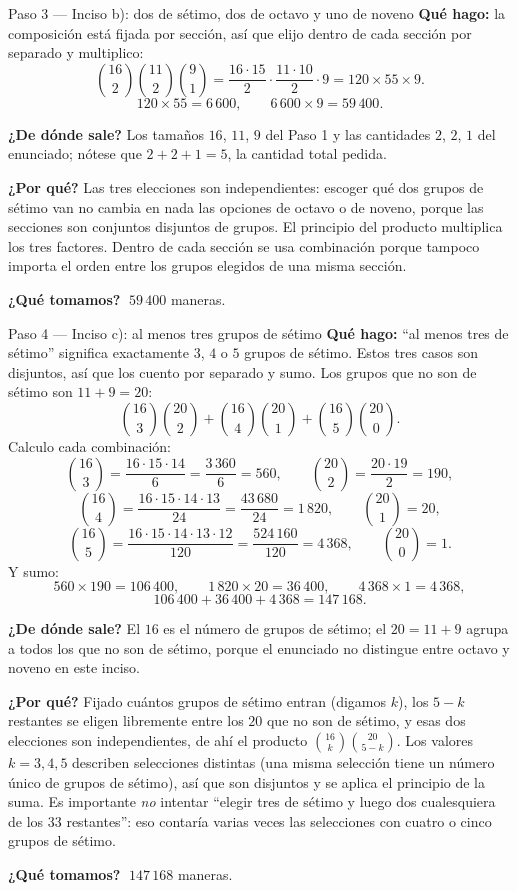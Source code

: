 \documentclass[11pt]{article}
\begin{document}
\begin{paso}{Paso 3 --- Inciso b): dos de sétimo, dos de octavo y uno de noveno}
\textbf{Qué hago:} la composición está fijada por sección, así que elijo dentro de cada sección por
separado y multiplico:
\[
\binom{16}{2}\binom{11}{2}\binom{9}{1}
=\frac{16\cdot15}{2}\cdot\frac{11\cdot10}{2}\cdot 9
=120\times55\times9 .
\]
\[
120\times55=6\,600,\qquad 6\,600\times9=59\,400 .
\]

\textbf{¿De dónde sale?} Los tamaños $16$, $11$, $9$ del Paso 1 y las cantidades $2$, $2$, $1$ del
enunciado; nótese que $2+2+1=5$, la cantidad total pedida.

\textbf{¿Por qué?} Las tres elecciones son independientes: escoger qué dos grupos de sétimo van no cambia
en nada las opciones de octavo o de noveno, porque las secciones son conjuntos disjuntos de grupos. El
principio del producto multiplica los tres factores. Dentro de cada sección se usa combinación porque
tampoco importa el orden entre los grupos elegidos de una misma sección.

\textbf{¿Qué tomamos?} $\;59\,400$ maneras.
\end{paso}

\begin{paso}{Paso 4 --- Inciso c): al menos tres grupos de sétimo}
\textbf{Qué hago:} ``al menos tres de sétimo'' significa exactamente $3$, $4$ o $5$ grupos de sétimo. Estos
tres casos son disjuntos, así que los cuento por separado y sumo. Los grupos que no son de sétimo son
$11+9=20$:
\[
\binom{16}{3}\binom{20}{2}+\binom{16}{4}\binom{20}{1}+\binom{16}{5}\binom{20}{0} .
\]
Calculo cada combinación:
\[
\binom{16}{3}=\frac{16\cdot15\cdot14}{6}=\frac{3\,360}{6}=560,\qquad
\binom{20}{2}=\frac{20\cdot19}{2}=190,
\]
\[
\binom{16}{4}=\frac{16\cdot15\cdot14\cdot13}{24}=\frac{43\,680}{24}=1\,820,\qquad
\binom{20}{1}=20,
\]
\[
\binom{16}{5}=\frac{16\cdot15\cdot14\cdot13\cdot12}{120}=\frac{524\,160}{120}=4\,368,\qquad
\binom{20}{0}=1 .
\]
Y sumo:
\[
560\times190=106\,400,\qquad 1\,820\times20=36\,400,\qquad 4\,368\times1=4\,368,
\]
\[
106\,400+36\,400+4\,368=147\,168 .
\]

\textbf{¿De dónde sale?} El $16$ es el número de grupos de sétimo; el $20=11+9$ agrupa a todos los que no
son de sétimo, porque el enunciado no distingue entre octavo y noveno en este inciso.

\textbf{¿Por qué?} Fijado cuántos grupos de sétimo entran (digamos $k$), los $5-k$ restantes se eligen
libremente entre los $20$ que no son de sétimo, y esas dos elecciones son independientes, de ahí el
producto $\binom{16}{k}\binom{20}{5-k}$. Los valores $k=3,4,5$ describen selecciones distintas (una misma
selección tiene un número único de grupos de sétimo), así que son disjuntos y se aplica el principio de la
suma. Es importante \emph{no} intentar ``elegir tres de sétimo y luego dos cualesquiera de los 33
restantes'': eso contaría varias veces las selecciones con cuatro o cinco grupos de sétimo.

\textbf{¿Qué tomamos?} $\;147\,168$ maneras.
\end{paso}
\end{document}
